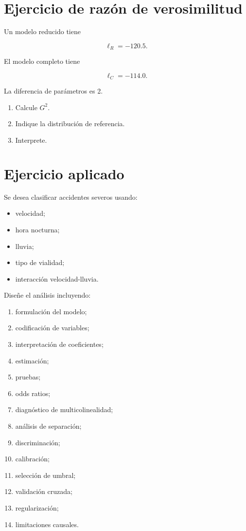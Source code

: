 \documentclass[
  spanish,
  11pt,
  letterpaper,
  DIV=11,
  numbers=noendperiod]{scrreprt}
\providecommand{\tightlist}{%
  \setlength{\itemsep}{0pt}\setlength{\parskip}{0pt}}
\theoremstyle{definition}
\theoremstyle{plain}
\theoremstyle{definition}
\theoremstyle{remark}
\begin{document}
\section{Ejercicio de razón de
verosimilitud}\label{ejercicio-de-razuxf3n-de-verosimilitud}

Un modelo reducido tiene

\[
\ell_R=-120.5.
\]

El modelo completo tiene

\[
\ell_C=-114.0.
\]

La diferencia de parámetros es 2.

\begin{enumerate}
\def\labelenumi{\arabic{enumi}.}
\tightlist
\item
  Calcule \(G^2\).
\item
  Indique la distribución de referencia.
\item
  Interprete.
\end{enumerate}

\section{Ejercicio aplicado}\label{ejercicio-aplicado-8}

Se desea clasificar accidentes severos usando:

\begin{itemize}
\tightlist
\item
  velocidad;
\item
  hora nocturna;
\item
  lluvia;
\item
  tipo de vialidad;
\item
  interacción velocidad-lluvia.
\end{itemize}

Diseñe el análisis incluyendo:

\begin{enumerate}
\def\labelenumi{\arabic{enumi}.}
\tightlist
\item
  formulación del modelo;
\item
  codificación de variables;
\item
  interpretación de coeficientes;
\item
  estimación;
\item
  pruebas;
\item
  odds ratios;
\item
  diagnóstico de multicolinealidad;
\item
  análisis de separación;
\item
  discriminación;
\item
  calibración;
\item
  selección de umbral;
\item
  validación cruzada;
\item
  regularización;
\item
  limitaciones causales.
\end{enumerate}
\end{document}
